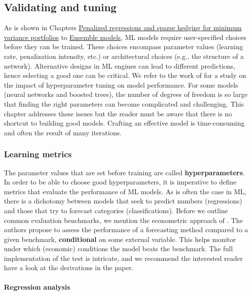 \subsection{Validating and tuning}


As is shown in Chapters \href{/chap-06-lasso}{Penalized regressions and sparse hedging for minimum variance portfolios} to \href{/chap-14-ensemble}{Ensemble models}, ML models require user-specified choices before they can be trained. These choices encompass parameter values (learning rate, penalization intensity, etc.) or architectural choices (e.g., the structure of a network). Alternative designs in ML engines can lead to different predictions, hence selecting a good one can be critical. We refer to the work of \cite{probst2018tunability} for a study on the impact of hyperparameter tuning on model performance. For some models (neural networks and boosted trees), the number of degrees of freedom is so large that finding the right parameters can become complicated and challenging. This chapter addresses these issues but the reader must be aware that there is no shortcut to building good models. Crafting an effective model is time-consuming and often the result of many iterations.

\subsubsection{Learning metrics}

The parameter values that are set before training are called \textbf{hyperparameters}. In order to be able to choose good hyperparameters, it is imperative to define metrics that evaluate the performance of ML models. As is often the case in ML, there is a dichotomy between models that seek to predict numbers (regressions) and those that try to forecast categories (classifications). Before we outline common evaluation benchmarks, we mention the econometric approach of \cite{li2020conditional}. The authors propose to assess the performance of a forecasting method compared to a given benchmark, \textbf{conditional} on some external variable. This helps monitor under which (economic) conditions the model beats the benchmark. The full implementation of the test is intricate, and we recommend the interested reader have a look at the derivations in the paper.

\paragraph{Regression analysis}

